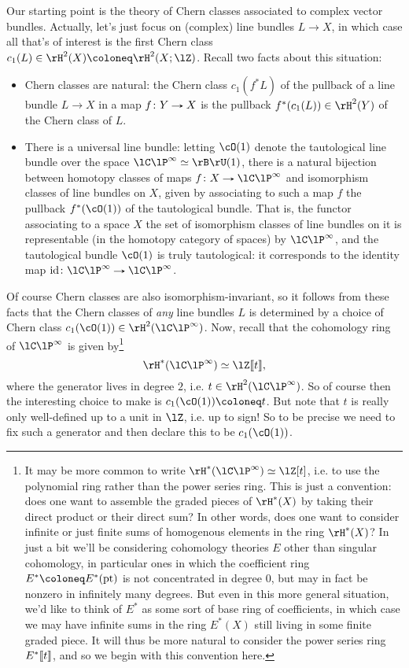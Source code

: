 Our starting point is the theory of Chern classes associated to
complex vector bundles. Actually, let's just focus on (complex) line
bundles $L \to X$, in which case all that's of interest is the first
Chern class $c_1(L) \in \rH^2(X) \ce \rH^2(X;\lZ)$. Recall two facts
about this situation:
\begin{itemize}
\item Chern classes are natural: the Chern class $c_1(f^*L)$ of the
  pullback of a line bundle $L \to X$ in a map $f \c Y \to X$ is the
  pullback $f^*(c_1(L)) \in \rH^2(Y)$ of the Chern class of $L$.
\item There is a universal line bundle: letting $\cO(1)$ denote the
  tautological line bundle over the space $\CP^\infty \iso \rB\rU(1)$,
  there is a natural bijection between homotopy classes of maps
  $f \c X \to \CP^\infty$ and isomorphism classes of line bundles on
  $X$, given by associating to such a map $f$ the pullback
  $f^*(\cO(1))$ of the tautological bundle. That is, the functor
  associating to a space $X$ the set of isomorphism classes of line
  bundles on it is representable (in the homotopy category of spaces)
  by $\CP^\infty$, and the tautological bundle $\cO(1)$ is truly
  tautological: it corresponds to the identity map
  $\id \c \CP^\infty \to \CP^\infty$.
\end{itemize}
Of course Chern classes are also isomorphism-invariant, so it follows
from these facts that the Chern classes of \emph{any} line bundles $L$
is determined by a choice of Chern class
$c_1(\cO(1)) \in \rH^2(\CP^\infty)$. Now, recall that the cohomology
ring of $\CP^\infty$ is given by\footnote{It may be more common to
  write $\rH^*(\CP^\infty) \iso \lZ[t]$, i.e. to use the polynomial
  ring rather than the power series ring. This is just a convention:
  does one want to assemble the graded pieces of $\rH^*(X)$ by taking
  their direct product or their direct sum? In other words, does one
  want to consider infinite or just finite sums of homogenous elements
  in the ring $\rH^*(X)$? In just a bit we'll be considering
  cohomology theories $E$ other than singular cohomology, in
  particular ones in which the coefficient ring $E^* \ce E^*(\pt)$ is
  not concentrated in degree $0$, but may in fact be nonzero in
  infinitely many degrees. But even in this more general situation,
  we'd like to think of $E^*$ as some sort of base ring of
  coefficients, in which case we may have infinite sums in the ring
  $E^*(X)$ still living in some finite graded piece. It will thus be
  more natural to consider the power series ring $E^* \llbracket t \rrbracket$,
  and so we begin with this convention here.}
\[
\rH^*(\CP^\infty) \iso \lZ \ldb t \rdb,
\]
where the generator lives in degree $2$, i.e.
$t \in \rH^2(\CP^\infty)$. So of course then the interesting choice to
make is $c_1(\cO(1)) \ce t$. But note that $t$ is really only
well-defined up to a unit in $\lZ$, i.e. up to sign! So to be precise
we need to fix such a generator and then declare this to be
$c_1(\cO(1))$.

